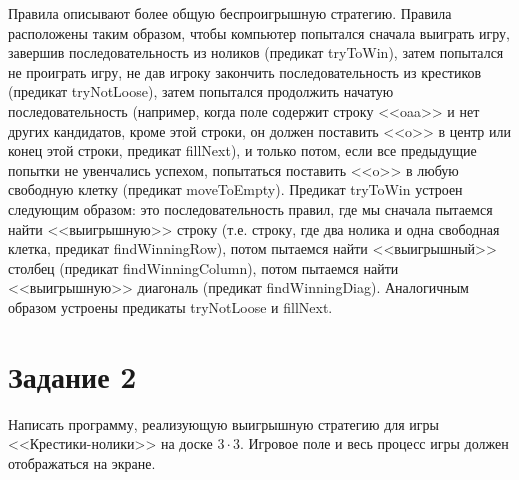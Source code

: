 \documentclass{article}
\begin{document}
Правила описывают более общую беспроигрышную стратегию. Правила
расположены таким образом, чтобы компьютер попытался сначала выиграть
игру, завершив последовательность из ноликов (предикат tryToWin),
затем попытался не проиграть игру, не дав игроку закончить
последовательность из крестиков (предикат tryNotLoose), затем
попытался продолжить начатую последовательность (например, когда поле
содержит строку <<oaa>> и нет других кандидатов, кроме этой строки, он
должен поставить <<o>> в центр или конец этой строки, предикат
fillNext), и только потом, если все предыдущие попытки не увенчались
успехом, попытаться поставить <<o>> в любую свободную клетку (предикат
moveToEmpty).  Предикат tryToWin устроен следующим образом: это
последовательность правил, где мы сначала пытаемся найти
<<выигрышную>> строку (т.е. строку, где два нолика и одна свободная
клетка, предикат findWinningRow), потом пытаемся найти <<выигрышный>>
столбец (предикат findWinningColumn), потом пытаемся найти
<<выигрышную>> диагональ (предикат findWinningDiag). Аналогичным
образом устроены предикаты tryNotLoose и fillNext.

\section*{Задание 2}
Написать программу, реализующую выигрышную стратегию для игры
<<Крестики-нолики>> на доске $3 \cdot 3$. Игровое поле и весь процесс игры
должен отображаться на экране.
\end{document}
